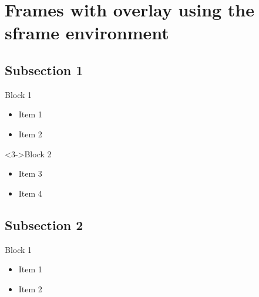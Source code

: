 \documentclass{beamer}
\begin{document}
    \section*{Frames with overlay using the sframe environment}

    \subsection*{Subsection 1}
    
        \begin{sframe}
            \begin{block}{Block 1}
                \begin{itemize}
                    \item<1-> Item 1
                    \item<2-> Item 2
                \end{itemize}
            \end{block}
            \begin{block}<3->{Block 2}
                \begin{itemize}
                    \item<3-> Item 3
                    \item<4-> Item 4
                \end{itemize}
            \end{block}
        \end{sframe}
    
    \subsection*{Subsection 2}
    
        \begin{sframe}[Subtitle]
            \begin{block}{Block 1}
                \begin{itemize}
                    \item Item 1
                    \item Item 2
                \end{itemize}
            \end{block}
        \end{sframe}
\end{document}
